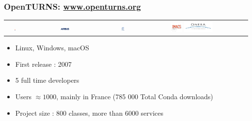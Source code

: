 \documentclass{beamer}
\begin{document}
\begin{frame}
\frametitle{OpenTURNS: \url{www.openturns.org}}

\begin{center}
   \begin{tabular}{ccccc}
   \includegraphics[width=0.07\textwidth]{figures/logoEDF_Anne.png}&
   \includegraphics[width=0.12\textwidth]{figures/LogoAirbus.png}&
   \includegraphics[width=0.12\textwidth]{figures/logo_phimeca.png}&
   \includegraphics[width=0.12\textwidth]{figures/logo_Imacs.png}
   \includegraphics[width=0.30\textwidth]{figures/logo_ONERA.jpg}&
   \end{tabular}
\end{center}

\vspace*{0.05cm}
\begin{itemize}
\item Linux, Windows, macOS
\item First release : 2007
\item 5 full time developers
\item Users $\approx 1000$, mainly in France
(785 000 Total Conda downloads)
\item Project size : 800  classes, more than 6000 services
\end{itemize}


\end{frame}

\end{document}

